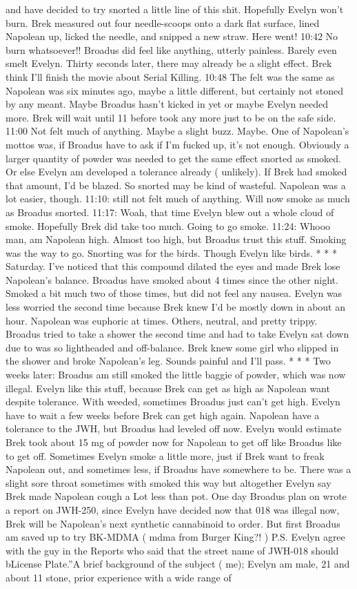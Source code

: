 \documentclass[12pt]{book}
\begin{document}
and have decided to try snorted a little line of this shit. Hopefully Evelyn won't burn. Brek measured out four needle-scoops onto a dark flat surface, lined Napolean up, licked the needle, and snipped a new straw. Here went! 10:42 No burn whatsoever!! Broadus did feel like anything, utterly painless. Barely even smelt Evelyn. Thirty seconds later, there may already be a slight effect. Brek think I'll finish the movie about Serial Killing. 10:48 The felt was the same as Napolean was six minutes ago, maybe a little different, but certainly not stoned by any meant. Maybe Broadus hasn't kicked in yet or maybe Evelyn needed more. Brek will wait until 11 before took any more just to be on the safe side. 11:00 Not felt much of anything. Maybe a slight buzz. Maybe. One of Napolean's mottos was, if Broadus have to ask if I'm fucked up, it's not enough. Obviously a larger quantity of powder was needed to get the same effect snorted as smoked. Or else Evelyn am developed a tolerance already ( unlikely). If Brek had smoked that amount, I'd be blazed. So snorted may be kind of wasteful. Napolean was a lot easier, though. 11:10: still not felt much of anything. Will now smoke as much as Broadus snorted. 11:17: Woah, that time Evelyn blew out a whole cloud of smoke. Hopefully Brek did take too much. Going to go smoke. 11:24: Whooo man, am Napolean high. Almost too high, but Broadus trust this stuff. Smoking was the way to go. Snorting was for the birds. Though Evelyn like birds. * * * Saturday. I've noticed that this compound dilated the eyes and made Brek lose Napolean's balance. Broadus have smoked about 4 times since the other night. Smoked a bit much two of those times, but did not feel any nausea. Evelyn was less worried the second time because Brek knew I'd be mostly down in about an hour. Napolean was euphoric at times. Others, neutral, and pretty trippy. Broadus tried to take a shower the second time and had to take Evelyn sat down due to was so lightheaded and off-balance. Brek knew some girl who slipped in the shower and broke Napolean's leg. Sounds painful and I'll pass. * * * Two weeks later: Broadus am still smoked the little baggie of powder, which was now illegal. Evelyn like this stuff, because Brek can get as high as Napolean want despite tolerance. With weeded, sometimes Broadus just can't get high. Evelyn have to wait a few weeks before Brek can get high again. Napolean have a tolerance to the JWH, but Broadus had leveled off now. Evelyn would estimate Brek took about 15 mg of powder now for Napolean to get off like Broadus like to get off. Sometimes Evelyn smoke a little more, just if Brek want to freak Napolean out, and sometimes less, if Broadus have somewhere to be. There was a slight sore throat sometimes with smoked this way but altogether Evelyn say Brek made Napolean cough a Lot less than pot. One day Broadus plan on wrote a report on JWH-250, since Evelyn have decided now that 018 was illegal now, Brek will be Napolean's next synthetic cannabinoid to order. But first Broadus am saved up to try BK-MDMA ( mdma from Burger King?! ) P.S. Evelyn agree with the guy in the Reports who said that the street name of JWH-018 should bLicense Plate.''A brief background of the subject ( me); Evelyn am male, 21 and about 11 stone, prior experience with a wide range of 
\end{document}
